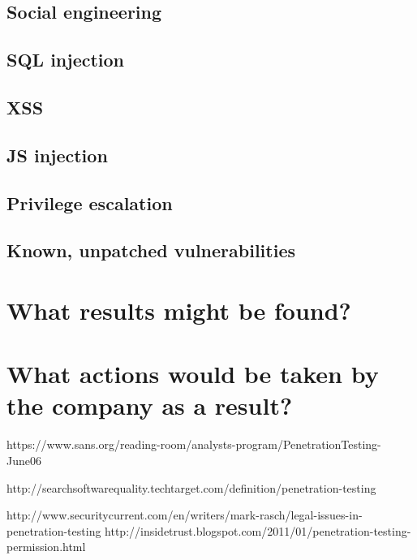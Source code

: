 \documentclass{article}
\begin{document}
\subsection{Social engineering}

\subsection{SQL injection}

\subsection{XSS}

\subsection{JS injection}

\subsection{Privilege escalation}

\subsection{Known, unpatched vulnerabilities}

\section{What results might be found? }

\section{What actions would be taken by the company as a result?}

\begin{thebibliography}{1}
     https://www.sans.org/reading-room/analysts-program/PenetrationTesting-June06

        http://searchsoftwarequality.techtarget.com/definition/penetration-testing

        http://www.securitycurrent.com/en/writers/mark-rasch/legal-issues-in-penetration-testing
     http://insidetrust.blogspot.com/2011/01/penetration-testing-permission.html
\end{thebibliography}
\end{document}
